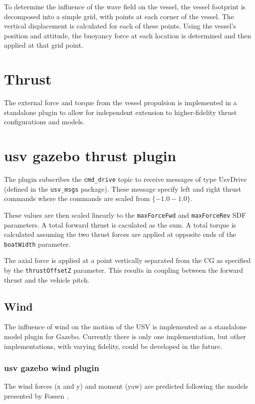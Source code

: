 \documentclass[11pt]{article}
\begin{document}
To determine the influence of the wave field on the vessel, the vessel footprint is decomposed into a simple grid, with points at each corner of the vessel.  The vertical displacement is calculated for each of these points.  Using the vessel's position and attitude, the buoyancy force at each location is determined and then applied at that grid point.


\section{Thrust}
The external force and torque from the vessel propulsion is implemented in a standalone plugin to allow for independent extension to higher-fidelity thrust configurations and models.

\section{usv gazebo thrust plugin}
The plugin subscribes the \verb+cmd_drive+ topic to receive messages of type UsvDrive (defined in the \verb+usv_msgs+ package).  These message specify left and right thrust commands where the commands are scaled from $\{-1.0-1.0\}$. 

These values are then scaled linearly to the \texttt{maxForceFwd} and \texttt{maxForceRev} SDF parameters.  A total forward thrust is caculated as the sum.  A total torque is calculated assuming the two thrust forces are applied at opposite ends of the \texttt{boatWidth} parameter.

The axial force is applied at a point vertically separated from the CG as specified by the \texttt{thrustOffsetZ} parameter.  This results in coupling between the forward thrust and the vehicle pitch.

\subsection{Wind}

The influence of wind on the motion of the USV is implemented as a standalone model plugin for Gazebo.  Currently there is only one implementation, but other implementations, with varying fidelity, could be developed in the future.

\subsubsection{usv gazebo wind plugin}

The wind forces (x and y) and moment (yaw) are predicted following the models presented by Fossen~\cite{fossen94guidance}.
\end{document}
